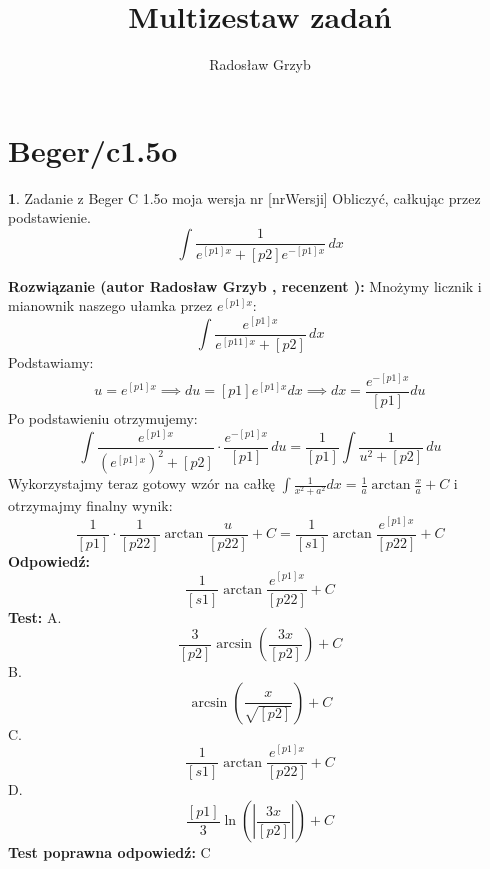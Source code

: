 \documentclass[12pt, a4paper]{article}
\title{Multizestaw zadań}
\author{Radosław Grzyb}
\date{}
\theoremstyle{definition} %
\newtheorem{zad}{}
\newcommand{\kategoria}[1]{\section{#1}} %
\newcommand{\zadStart}[1]{\begin{zad}#1\newline} %
\newcommand{\zadStop}{\end{zad}}   %
\newcommand{\rozwStart}[2]{\noindent \textbf{Rozwiązanie (autor #1 , recenzent #2): }\newline} %
\newcommand{\rozwStop}{\newline}                                            %
\newcommand{\odpStart}{\noindent \textbf{Odpowiedź:}\newline}    %
\newcommand{\odpStop}{\newline}                                             %
\newcommand{\testStart}{\noindent \textbf{Test:}\newline} %
\newcommand{\testStop}{\newline} %
\newcommand{\kluczStart}{\noindent \textbf{Test poprawna odpowiedź:}\newline} %
\newcommand{\kluczStop}{\newline} %
\begin{document}
\maketitle
\kategoria{Beger/c1.5o}
\zadStart{Zadanie z Beger C 1.5o moja wersja nr [nrWersji]}
Obliczyć, całkując przez podstawienie.
$$\int \frac{1}{e^{[p1]x}+[p2]e^{-[p1]x}} \,dx$$
\zadStop
\rozwStart{Radosław Grzyb}{}
Mnożymy licznik i mianownik naszego ułamka przez $e^{[p1]x}$:
$$\int \frac{e^{[p1]x}}{e^{[p11]x}+[p2]} \,dx$$
Podstawiamy: 
$$u=e^{[p1]x}\implies du=[p1]e^{[p1]x}dx \implies dx=\frac{e^{-[p1]x}}{[p1]}du$$
Po podstawieniu otrzymujemy:
$$\int \frac{e^{[p1]x}}{(e^{[p1]x})^{2}+[p2]}\cdot\frac{e^{-[p1]x}}{[p1]} \,du=\frac{1}{[p1]}\int \frac{1}{u^{2}+[p2]} \,du$$
Wykorzystajmy teraz gotowy wzór na całkę $\int\frac{1}{x^2+a^2}dx=\frac{1}{a}\arctan\frac{x}{a}+C$ i otrzymajmy finalny wynik:
$$\frac{1}{[p1]}\cdot\frac{1}{[p22]}\arctan\frac{u}{[p22]}+C=\frac{1}{[s1]}\arctan\frac{e^{[p1]x}}{[p22]}+C$$
\rozwStop
\odpStart
$$\frac{1}{[s1]}\arctan\frac{e^{[p1]x}}{[p22]}+C$$
\odpStop
\testStart
A.$$\frac{3}{[p2]}\arcsin(\frac{3x}{[p2]})+C$$
B.$$\arcsin(\frac{x}{\sqrt{[p2]}})+C$$
C.$$\frac{1}{[s1]}\arctan\frac{e^{[p1]x}}{[p22]}+C$$
D.$$\frac{[p1]}{3}\ln(|\frac{3x}{[p2]}|)+C$$
\testStop
\kluczStart
C
\kluczStop
\end{document}
